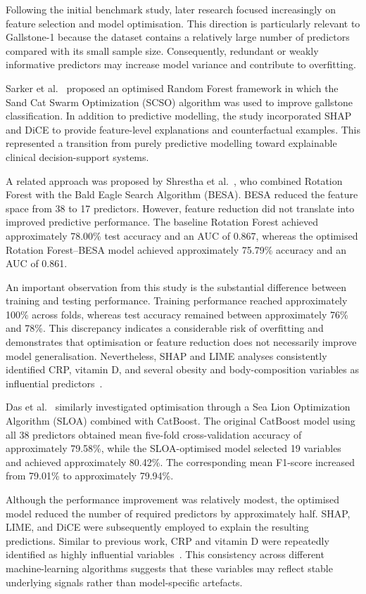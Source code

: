 Following the initial benchmark study, later research focused increasingly on feature selection and model optimisation. This direction is particularly relevant to Gallstone-1 because the dataset contains a relatively large number of predictors compared with its small sample size. Consequently, redundant or weakly informative predictors may increase model variance and contribute to overfitting.

Sarker et al.~\cite{sarker2025gallstone} proposed an optimised Random Forest framework in which the Sand Cat Swarm Optimization (SCSO) algorithm was used to improve gallstone classification. In addition to predictive modelling, the study incorporated SHAP and DiCE to provide feature-level explanations and counterfactual examples. This represented a transition from purely predictive modelling toward explainable clinical decision-support systems.

A related approach was proposed by Shrestha et al.~\cite{shrestha2026metaheuristic}, who combined Rotation Forest with the Bald Eagle Search Algorithm (BESA). BESA reduced the feature space from 38 to 17 predictors. However, feature reduction did not translate into improved predictive performance. The baseline Rotation Forest achieved approximately 78.00\% test accuracy and an AUC of 0.867, whereas the optimised Rotation Forest--BESA model achieved approximately 75.79\% accuracy and an AUC of 0.861.

An important observation from this study is the substantial difference between training and testing performance. Training performance reached approximately 100\% across folds, whereas test accuracy remained between approximately 76\% and 78\%. This discrepancy indicates a considerable risk of overfitting and demonstrates that optimisation or feature reduction does not necessarily improve model generalisation. Nevertheless, SHAP and LIME analyses consistently identified CRP, vitamin D, and several obesity and body-composition variables as influential predictors~\cite{shrestha2026metaheuristic}.

Das et al.~\cite{das2026sloa} similarly investigated optimisation through a Sea Lion Optimization Algorithm (SLOA) combined with CatBoost. The original CatBoost model using all 38 predictors obtained mean five-fold cross-validation accuracy of approximately 79.58\%, while the SLOA-optimised model selected 19 variables and achieved approximately 80.42\%. The corresponding mean F1-score increased from 79.01\% to approximately 79.94\%.

Although the performance improvement was relatively modest, the optimised model reduced the number of required predictors by approximately half. SHAP, LIME, and DiCE were subsequently employed to explain the resulting predictions. Similar to previous work, CRP and vitamin D were repeatedly identified as highly influential variables~\cite{das2026sloa}. This consistency across different machine-learning algorithms suggests that these variables may reflect stable underlying signals rather than model-specific artefacts.


